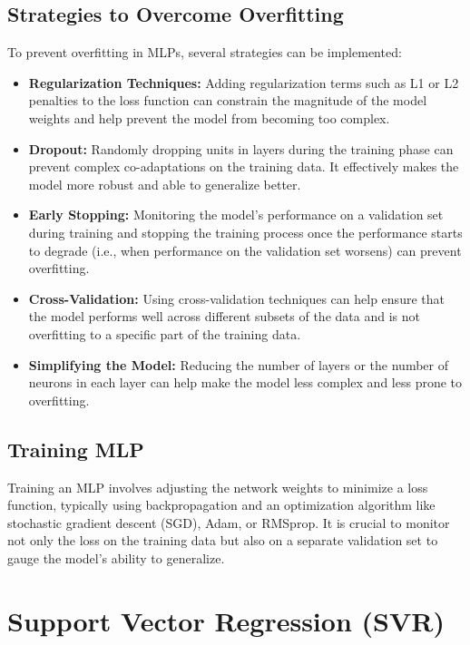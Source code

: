 \documentclass[12pt]{article}
\begin{document}
\subsection{Strategies to Overcome Overfitting}
To prevent overfitting in MLPs, several strategies can be implemented:
\begin{itemize}
    \item \textbf{Regularization Techniques:} Adding regularization terms such as L1 or L2 penalties to the loss function can constrain the magnitude of the model weights and help prevent the model from becoming too complex.
    \item \textbf{Dropout:} Randomly dropping units in layers during the training phase can prevent complex co-adaptations on the training data. It effectively makes the model more robust and able to generalize better.
    \item \textbf{Early Stopping:} Monitoring the model's performance on a validation set during training and stopping the training process once the performance starts to degrade (i.e., when performance on the validation set worsens) can prevent overfitting.
    \item \textbf{Cross-Validation:} Using cross-validation techniques can help ensure that the model performs well across different subsets of the data and is not overfitting to a specific part of the training data.
    \item \textbf{Simplifying the Model:} Reducing the number of layers or the number of neurons in each layer can help make the model less complex and less prone to overfitting.
\end{itemize}

\subsection{Training MLP}
Training an MLP involves adjusting the network weights to minimize a loss function, typically using backpropagation and an optimization algorithm like stochastic gradient descent (SGD), Adam, or RMSprop. It is crucial to monitor not only the loss on the training data but also on a separate validation set to gauge the model's ability to generalize.







\section{Support Vector Regression (SVR)}
\end{document}
